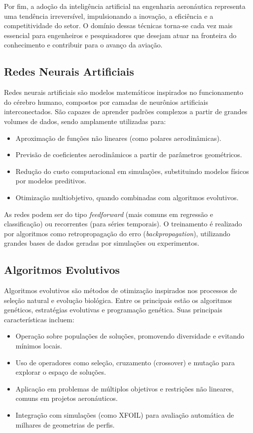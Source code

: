 Por fim, a adoção da inteligência artificial na engenharia aeronáutica representa uma tendência irreversível, impulsionando a inovação, a eficiência e a competitividade do setor. O domínio dessas técnicas torna-se cada vez mais essencial para engenheiros e pesquisadores que desejam atuar na fronteira do conhecimento e contribuir para o avanço da aviação.

\subsection{Redes Neurais Artificiais}
Redes neurais artificiais são modelos matemáticos inspirados no funcionamento do cérebro humano, compostos por camadas de neurônios artificiais interconectados. São capazes de aprender padrões complexos a partir de grandes volumes de dados, sendo amplamente utilizadas para:

\begin{itemize}
    \item Aproximação de funções não lineares (como polares aerodinâmicas).
    \item Previsão de coeficientes aerodinâmicos a partir de parâmetros geométricos.
    \item Redução do custo computacional em simulações, substituindo modelos físicos por modelos preditivos.
    \item Otimização multiobjetivo, quando combinadas com algoritmos evolutivos.
\end{itemize}

As redes podem ser do tipo \textit{feedforward} (mais comuns em regressão e classificação) ou recorrentes (para séries temporais). O treinamento é realizado por algoritmos como retropropagação do erro (\textit{backpropagation}), utilizando grandes bases de dados geradas por simulações ou experimentos.

\subsection{Algoritmos Evolutivos}
Algoritmos evolutivos são métodos de otimização inspirados nos processos de seleção natural e evolução biológica. Entre os principais estão os algoritmos genéticos, estratégias evolutivas e programação genética. Suas principais características incluem:

\begin{itemize}
    \item Operação sobre populações de soluções, promovendo diversidade e evitando mínimos locais.
    \item Uso de operadores como seleção, cruzamento (crossover) e mutação para explorar o espaço de soluções.
    \item Aplicação em problemas de múltiplos objetivos e restrições não lineares, comuns em projetos aeronáuticos.
    \item Integração com simulações (como XFOIL) para avaliação automática de milhares de geometrias de perfis.
\end{itemize}

